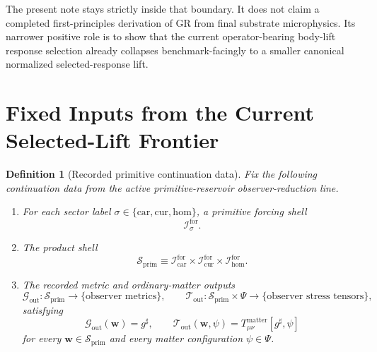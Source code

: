 \documentclass[11pt]{article}
\newcommand{\CompletedMetric}{g^{\sharp}}
\newcommand{\MatterSpace}{\Psi}
\newcommand{\Car}{\mathrm{car}}
\newcommand{\Cur}{\mathrm{cur}}
\newcommand{\Hom}{\mathrm{hom}}
\newcommand{\ForSpace}[1]{\mathcal I_{#1}^{\mathrm{for}}}
\newcommand{\PrimShell}{\mathcal S_{\mathrm{prim}}}
\newcommand{\MetricOut}{\mathscr G_{\mathrm{out}}}
\newcommand{\MatterOut}{\mathscr T_{\mathrm{out}}}
\newtheorem{definition}{Definition}
\begin{document}
The present note stays strictly inside that boundary. It does not claim a completed first-principles derivation of GR from final substrate microphysics. Its narrower positive role is to show that the current operator-bearing body-lift response selection already collapses benchmark-facingly to a smaller canonical normalized selected-response lift.

\section{Fixed Inputs from the Current Selected-Lift Frontier}

\begin{definition}[Recorded primitive continuation data]
\label{def:fixed}
Fix the following continuation data from the active primitive-reservoir observer-reduction line.
\begin{enumerate}
    \item For each sector label \(\sigma\in\{\Car,\Cur,\Hom\}\), a primitive forcing shell
    \[
    \ForSpace{\sigma}.
    \]
    \item The product shell
    \[
    \PrimShell
    \equiv
    \ForSpace{\Car}\times \ForSpace{\Cur}\times \ForSpace{\Hom}.
    \]
    \item The recorded metric and ordinary-matter outputs
    \[
    \MetricOut:\PrimShell\to\{\text{observer metrics}\},
    \qquad
    \MatterOut:\PrimShell\times\MatterSpace\to\{\text{observer stress tensors}\},
    \]
    satisfying
    \begin{equation}
    \MetricOut(\mathbf w)=\CompletedMetric,
    \qquad
    \MatterOut(\mathbf w,\psi)
    =
    T_{\mu\nu}^{\mathrm{matter}}[\CompletedMetric,\psi]
    \label{eq:fixedoutputs}
    \end{equation}
    for every \(\mathbf w\in\PrimShell\) and every matter configuration \(\psi\in\MatterSpace\).
\end{enumerate}
\end{definition}
\end{document}
